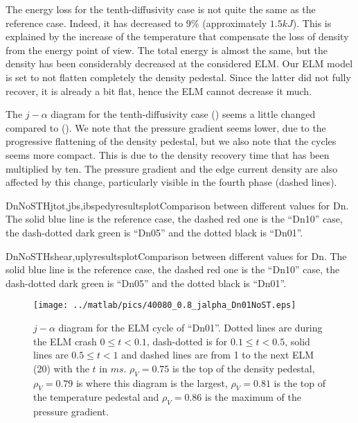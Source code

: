 The energy loss for the tenth-diffusivity case is not quite the same as the reference case. Indeed, it has decreased to $9\%$ (approximately $1.5 kJ$). This is explained by the increase of the temperature that compensate the loss of density from the energy point of view. The total energy is almost the same, but the density has been considerably decreased at the considered ELM. Our ELM model is set to not flatten completely the density pedestal. Since the latter did not fully recover, it is already a bit flat, hence the ELM cannot decrease it much.

The $j - \alpha$ diagram for the tenth-diffusivity case () seems a little changed compared to (). We note that the pressure gradient seems lower, due to the progressive flattening of the density pedestal, but we also note that the cycles seems more compact. This is due to the density recovery time that has been multiplied by ten. The pressure gradient and the edge current density are also affected by this change, particularly visible in the fourth phase (dashed lines).

\begin{AllFigs}{DnNoST}{H}{}{jtot,jbs,ibsped}{y}{resultsplot}{Comparison between different values for Dn. The solid blue line is the reference case, the dashed red one is the ``Dn10'' case, the dash-dotted dark green is ``Dn05'' and the dotted black is ``Dn01''.}
\end{AllFigs}
\begin{AllFigs}{DnNoST}{H}{}{shear,upl}{y}{resultsplot}{Comparison between different values for Dn. The solid blue line is the reference case, the dashed red one is the ``Dn10'' case, the dash-dotted dark green is ``Dn05'' and the dotted black is ``Dn01''.}
\end{AllFigs}
\begin{figure}[H]
\vspace{-6mm}
\begin{center}
\texttt{[image: ../matlab/pics/40080\_0.8\_jalpha\_Dn01NoST.eps]}
\vspace{-5mm}
\end{center}
\caption{\footnotesize $j - \alpha$ diagram for the ELM cycle of ``Dn01''. Dotted lines are during the ELM crash $0 \le t < 0.1$, dash-dotted is for $0.1 \le t < 0.5$, solid lines are $0.5 \le t < 1$ and dashed lines are from 1 to the next ELM (20) with the $t$ in $ms$. $\rho_V = 0.75$ is the top of the density pedestal, $\rho_V = 0.79$ is where this diagram is the largest, $\rho_V = 0.81$ is the top of the temperature pedestal and $\rho_V = 0.86$ is the maximum of the pressure gradient.\label{fig:results:ELM:Dn01:jalpha}}
\vspace{-5mm}
\end{figure}

